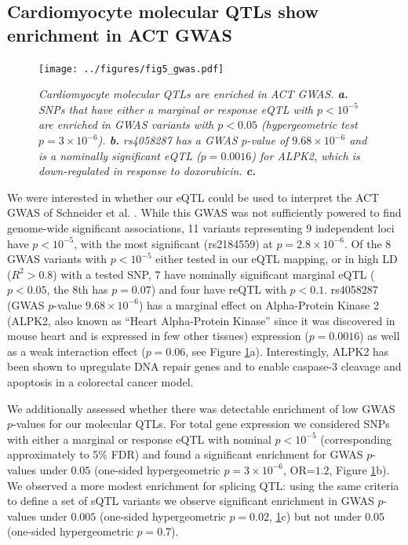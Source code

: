 \documentclass{article}
\begin{document}
{\subsection*{Cardiomyocyte molecular QTLs show enrichment in ACT GWAS} 

\begin{figure}
\begin{center}
    \texttt{[image: ../figures/fig5\_gwas.pdf]}     \caption{\it{Cardiomyocyte molecular QTLs are enriched in ACT GWAS. \textbf{a.} SNPs that have either a marginal or response eQTL with $p<10^{-5}$ are enriched in GWAS variants with $p<0.05$ (hypergeometric test $p=3 \times 10^{-6}$). \textbf{b.} rs4058287 has a GWAS $p$-value of $9.68\times 10^{-6}$ and is a nominally significant eQTL ($p=0.0016$) for ALPK2, which is down-regulated in response to doxorubicin. \textbf{c.} }}
    \label{fig:gwas}
    \end{center}
\end{figure}


We were interested in whether our eQTL could be used to interpret the ACT GWAS of Schneider et al. \cite{Schneider2016}. While this GWAS was not sufficiently powered to find genome-wide significant associations, 11 variants representing 9 independent loci have $p<10^{-5}$, with the most significant (rs2184559) at $p=2.8 \times 10^{-6}$. Of the 8 GWAS variants with $p<10^{-5}$ either tested in our eQTL mapping, or in high LD ($R^2 > 0.8$) with a tested SNP, 7 have nominally significant marginal eQTL ($p<0.05$, the 8th has $p=0.07$) and four have reQTL with $p<0.1$. rs4058287 (GWAS $p$-value $9.68\times 10^{-6}$) has a marginal effect on Alpha-Protein Kinase 2 (ALPK2, also known as ``Heart Alpha-Protein Kinase'' since it was discovered in mouse heart\cite{ryazanov1999alpha} and is expressed in few other tissues\cite{gtex}) expression ($p=0.0016$) as well as a weak interaction effect ($p=0.06$, see Figure \ref{fig:gwas}a). Interestingly, ALPK2 has been shown to upregulate DNA repair genes and to enable caspase-3 cleavage and apoptosis in a colorectal cancer model\citep{yoshida2012alpk2}. 

We additionally assessed whether there was detectable enrichment of low GWAS $p$-values for our molecular QTLs. For total gene expression we considered SNPs with either a marginal or response eQTL with nominal $p < 10^{-5}$ (corresponding approximately to 5\% FDR) and found a significant enrichment for GWAS $p$-values under $0.05$ (one-sided hypergeometric $p=3 \times 10^{-6}$, OR=$1.2$, Figure \ref{fig:gwas}b). We observed a more modest enrichment for splicing QTL: using the same criteria to define a set of sQTL variants we observe significant enrichment in GWAS $p$-values under $0.005$ (one-sided hypergeometric $p=0.02$, \ref{fig:gwas}c) but not under $0.05$ (one-sided hypergeometric $p=0.7$).  

}
\end{document}
